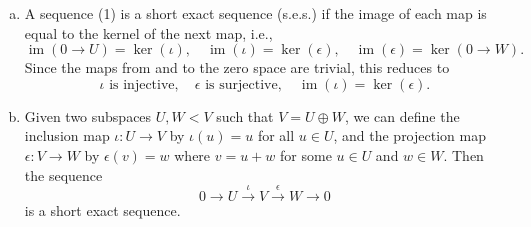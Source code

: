 \documentclass{article}
\begin{document}
\begin{enumerate}[a)]
    \item A sequence (1) is a short exact sequence (s.e.s.) if the image of each map is equal to the kernel of the next map, i.e.,
    \[
        \operatorname{im}(0 \to U) = \ker(\iota), \quad \operatorname{im}(\iota) = \ker(\epsilon), \quad \operatorname{im}(\epsilon) = \ker(0 \to W).
    \]
    Since the maps from and to the zero space are trivial, this reduces to
    \[
        \iota \text{ is injective}, \quad \epsilon \text{ is surjective}, \quad \operatorname{im}(\iota) = \ker(\epsilon).
    \]
    \item Given two subspaces $U,W < V$ such that $V = U \oplus W$, we can define the inclusion map $\iota: U \to V$ by $\iota(u) = u$ for all $u \in U$, and the projection map $\epsilon: V \to W$ by $\epsilon(v) = w$ where $v = u + w$ for some $u \in U$ and $w \in W$. Then the sequence
    \[
        0 \xrightarrow{} U \xrightarrow{\iota} V \xrightarrow{\epsilon} W \xrightarrow{} 0
    \]
    is a short exact sequence.


\end{enumerate}
\end{document}
